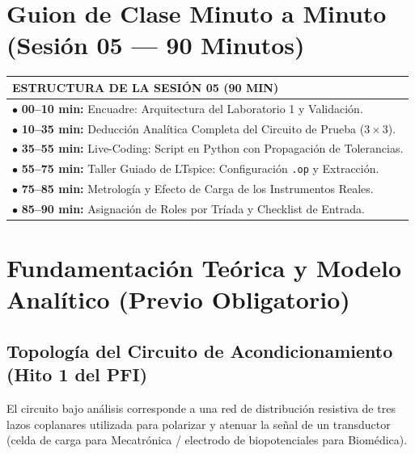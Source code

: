 \documentclass[11pt, a4paper]{article}
\begin{document}
\section{Guion de Clase Minuto a Minuto (Sesión 05 — 90 Minutos)}
\begin{center}
    \begin{tabular}{|p{}|}
        \hline
        \cellcolor{gray!10} \textbf{ESTRUCTURA DE LA SESIÓN 05 (90 MIN)} \\
        \hline
        $\bullet$ \textbf{00--10 min:} Encuadre: Arquitectura del Laboratorio 1 y Validación. \\
        $\bullet$ \textbf{10--35 min:} Deducción Analítica Completa del Circuito de Prueba ($3\times 3$). \\
        $\bullet$ \textbf{35--55 min:} Live-Coding: Script en Python con Propagación de Tolerancias. \\
        $\bullet$ \textbf{55--75 min:} Taller Guiado de LTspice: Configuración \texttt{.op} y Extracción. \\
        $\bullet$ \textbf{75--85 min:} Metrología y Efecto de Carga de los Instrumentos Reales. \\
        $\bullet$ \textbf{85--90 min:} Asignación de Roles por Tríada y Checklist de Entrada. \\
        \hline
    \end{tabular}
\end{center}

\section{Fundamentación Teórica y Modelo Analítico (Previo Obligatorio)}
\subsection{Topología del Circuito de Acondicionamiento (Hito 1 del PFI)}
El circuito bajo análisis corresponde a una red de distribución resistiva de tres lazos coplanares utilizada para polarizar y atenuar la señal de un transductor (celda de carga para Mecatrónica / electrodo de biopotenciales para Biomédica).
\end{document}
